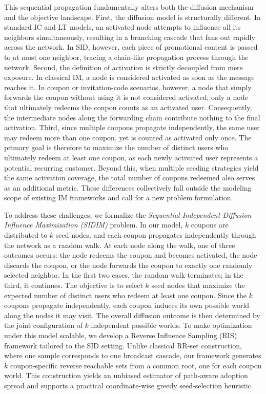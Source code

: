 \documentclass[sigconf]{acmart}
\begin{document}
This sequential propagation fundamentally alters both the diffusion mechanism and the objective landscape. First, the diffusion model is structurally different. In standard IC and LT models, an activated node attempts to influence all its neighbors simultaneously, resulting in a branching cascade that fans out rapidly across the network. In SID, however, each piece of promotional content is passed to at most one neighbor, tracing a chain-like propagation process through the network. Second, the definition of activation is strictly decoupled from mere exposure. In classical IM, a node is considered activated as soon as the message reaches it. In coupon or invitation-code scenarios, however, a node that simply forwards the coupon without using it is not considered activated; only a node that ultimately redeems the coupon counts as an activated user. Consequently, the intermediate nodes along the forwarding chain contribute nothing to the final activation. Third, since multiple coupons propagate independently, the same user may redeem more than one coupon, yet is counted as activated only once. The primary goal is therefore to maximize the number of distinct users who ultimately redeem at least one coupon, as each newly activated user represents a potential recurring customer. Beyond this, when multiple seeding strategies yield the same activation coverage, the total number of coupons redeemed also serves as an additional metric. These differences collectively fall outside the modeling scope of existing IM frameworks and call for a new problem formulation.

To address these challenges, we formalize the \emph{Sequential Independent Diffusion Influence Maximization (SIDIM)} problem. In our model, $k$ coupons are distributed to $k$ seed nodes, and each coupon propagates independently through the network as a random walk. At each node along the walk, one of three outcomes occurs: the node redeems the coupon and becomes activated, the node discards the coupon, or the node forwards the coupon to exactly one randomly selected neighbor. In the first two cases, the random walk terminates; in the third, it continues. The objective is to select $k$ seed nodes that maximize the expected number of distinct users who redeem at least one coupon. Since the $k$ coupons propagate independently, each coupon induces its own possible world along the nodes it may visit. The overall diffusion outcome is then determined by the joint configuration of $k$ independent possible worlds. To make optimization under this model scalable, we develop a Reverse Influence Sampling (RIS) framework tailored to the SID setting. Unlike classical RR-set construction, where one sample corresponds to one broadcast cascade, our framework generates $k$ coupon-specific reverse reachable sets from a common root, one for each coupon world. This construction yields an unbiased estimator of path-aware adoption spread and supports a practical coordinate-wise greedy seed-selection heuristic.
\end{document}
